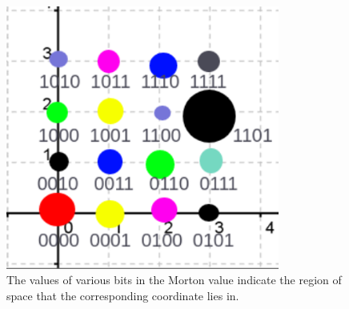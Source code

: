 \documentclass[11pt,a4paper]{article}
\begin{document}
\begin{figure}[H]	
     \centering
         \includegraphics[width=9cm]{images/example_lbvh/scene_2.png}
        \caption{The values of various bits in the Morton value indicate the region of space that the corresponding coordinate lies in. }
        \label{fig:dice}
\end{figure}
\end{document}
